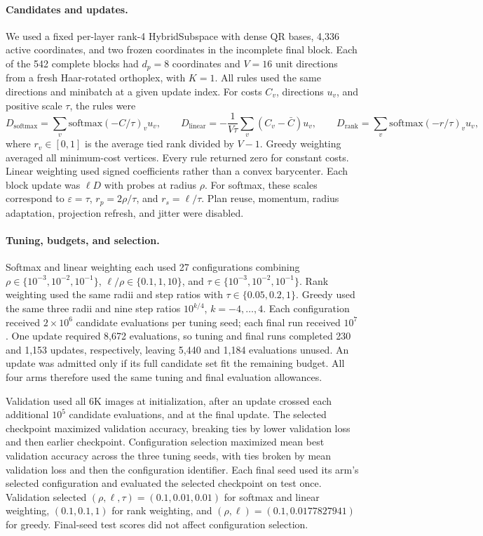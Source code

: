 \paragraph{Candidates and updates.}
We used a fixed per-layer rank-4 HybridSubspace with dense QR bases,
4,336 active coordinates, and two frozen coordinates in the incomplete
final block. Each of the 542 complete blocks had $d_p=8$ coordinates and
$V=16$ unit directions from a fresh Haar-rotated orthoplex, with $K=1$.
All rules used the same directions and minibatch at a given update index.
For costs $C_v$, directions $u_v$, and positive scale $\tau$, the rules were
\[
D_{\mathrm{softmax}}=\sum_v\mathrm{softmax}(-C/\tau)_v u_v,
\qquad
D_{\mathrm{linear}}=-\frac{1}{V\tau}\sum_v(C_v-\bar C)u_v,
\qquad
D_{\mathrm{rank}}=\sum_v\mathrm{softmax}(-r/\tau)_v u_v,
\]
where $r_v\in[0,1]$ is the average tied rank divided by $V-1$.
Greedy weighting averaged all minimum-cost vertices. Every rule returned
zero for constant costs. Linear weighting used signed coefficients rather
than a convex barycenter. Each block update was $\ell D$ with probes at
radius $\rho$. For softmax, these scales correspond to
$\varepsilon=\tau$, $r_p=2\rho/\tau$, and $r_s=\ell/\tau$.
Plan reuse, momentum, radius adaptation, projection refresh, and jitter were disabled.

\paragraph{Tuning, budgets, and selection.}
Softmax and linear weighting each used 27 configurations combining
$\rho\in\{10^{-3},10^{-2},10^{-1}\}$,
$\ell/\rho\in\{0.1,1,10\}$, and
$\tau\in\{10^{-3},10^{-2},10^{-1}\}$.
Rank weighting used the same radii and step ratios with
$\tau\in\{0.05,0.2,1\}$. Greedy used the same three radii and nine
step ratios $10^{k/4}$, $k=-4,\ldots,4$.
Each configuration received $2\times10^6$ candidate evaluations per tuning
seed; each final run received $10^7$. One update required 8,672 evaluations,
so tuning and final runs completed 230 and 1,153 updates, respectively,
leaving 5,440 and 1,184 evaluations unused. An update was admitted only if
its full candidate set fit the remaining budget.
All four arms therefore used the same tuning and final evaluation allowances.

Validation used all 6K images at initialization, after an update crossed
each additional $10^5$ candidate evaluations, and at the final update.
The selected checkpoint maximized validation accuracy, breaking ties by
lower validation loss and then earlier checkpoint. Configuration selection
maximized mean best validation accuracy across the three tuning seeds,
with ties broken by mean validation loss and then the configuration identifier.
Each final seed used its arm's selected configuration and evaluated the
selected checkpoint on test once. Validation selected
$(\rho,\ell,\tau)=(0.1,0.01,0.01)$ for softmax and linear weighting,
$(0.1,0.1,1)$ for rank weighting, and $(\rho,\ell)=(0.1,0.0177827941)$
for greedy. Final-seed test scores did not affect configuration selection.

